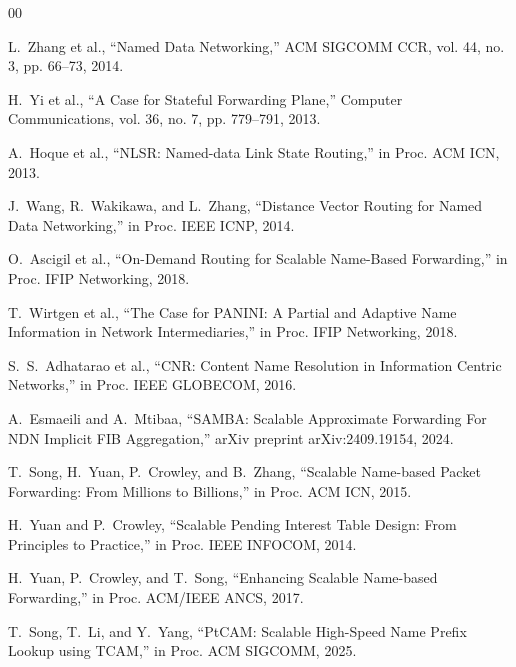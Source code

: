 \documentclass[journal]{IEEEtran}
\begin{document}

\begin{thebibliography}{00}

L.~Zhang et al., ``Named Data Networking,'' ACM SIGCOMM CCR, vol. 44, no. 3, pp. 66--73, 2014.

H.~Yi et al., ``A Case for Stateful Forwarding Plane,'' Computer Communications, vol. 36, no. 7, pp. 779--791, 2013.

A.~Hoque et al., ``NLSR: Named-data Link State Routing,'' in Proc. ACM ICN, 2013.

J.~Wang, R.~Wakikawa, and L.~Zhang, ``Distance Vector Routing for Named Data Networking,'' in Proc. IEEE ICNP, 2014.

O.~Ascigil et al., ``On-Demand Routing for Scalable Name-Based Forwarding,'' in Proc. IFIP Networking, 2018.

T.~Wirtgen et al., ``The Case for PANINI: A Partial and Adaptive Name Information in Network Intermediaries,'' in Proc. IFIP Networking, 2018.

S.~S.~Adhatarao et al., ``CNR: Content Name Resolution in Information Centric Networks,'' in Proc. IEEE GLOBECOM, 2016.

A.~Esmaeili and A.~Mtibaa, ``SAMBA: Scalable Approximate Forwarding For NDN Implicit FIB Aggregation,'' arXiv preprint arXiv:2409.19154, 2024.

T.~Song, H.~Yuan, P.~Crowley, and B.~Zhang, ``Scalable Name-based Packet Forwarding: From Millions to Billions,'' in Proc. ACM ICN, 2015.

H.~Yuan and P.~Crowley, ``Scalable Pending Interest Table Design: From Principles to Practice,'' in Proc. IEEE INFOCOM, 2014.

H.~Yuan, P.~Crowley, and T.~Song, ``Enhancing Scalable Name-based Forwarding,'' in Proc. ACM/IEEE ANCS, 2017.

T.~Song, T.~Li, and Y.~Yang, ``PtCAM: Scalable High-Speed Name Prefix Lookup using TCAM,'' in Proc. ACM SIGCOMM, 2025.


\end{thebibliography}
\end{document}
